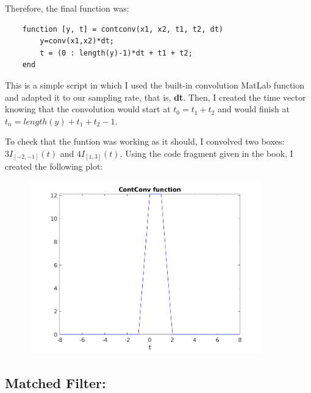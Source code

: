 \documentclass[a4paper,11pt]{article}
\begin{document}
\newpage

Therefore, the final function was:

\bigskip

\begin{lstlisting}
    function [y, t] = contconv(x1, x2, t1, t2, dt)
        y=conv(x1,x2)*dt;
        t = (0 : length(y)-1)*dt + t1 + t2;  
    end
\end{lstlisting}

\bigskip

This is a simple script in which I used the built-in convolution MatLab function and adapted it to our sampling rate, that is, \textbf{dt}. Then, I created the time vector knowing that the convolution would start at $t_{0} = t_{1} + t_{2}$ and would finish at $t_{n} = length(y) + t_{1} + t_{2} -1$.

\bigskip

To check that the funtion was working as it should, I convolved two boxes: $3I_{[-2,-1]}(t)$ and $4I_{[1,3]}(t)$. Using the code fragment given in the book, I created the following plot:

\begin{figure}[!hp]
    \begin{center}
      \includegraphics[width=0.9\textwidth]{images/exercice_2.png}
    \end{center}
\end{figure}

\newpage

\subsection{Matched Filter:}
\end{document}

